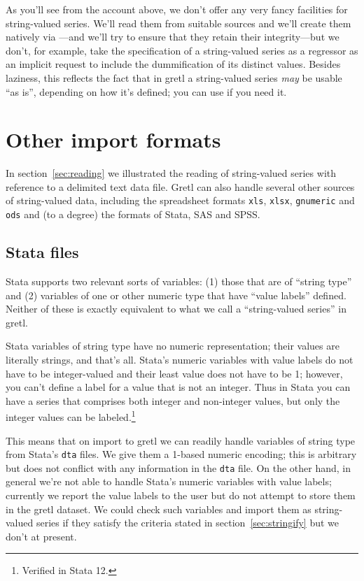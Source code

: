 As you'll see from the account above, we don't offer any very fancy
facilities for string-valued series. We'll read them from suitable
sources and we'll create them natively via ---and
we'll try to ensure that they retain their integrity---but we don't,
for example, take the specification of a string-valued series as a
regressor as an implicit request to include the dummification of its
distinct values. Besides laziness, this reflects the fact that in
gretl a string-valued series \textit{may} be usable ``as is'',
depending on how it's defined; you can use  if you
need it.

\section{Other import formats}
\label{sec:other-imports}

In section~\ref{sec:reading} we illustrated the reading of
string-valued series with reference to a delimited text data
file. Gretl can also handle several other sources of string-valued
data, including the spreadsheet formats \texttt{xls}, \texttt{xlsx},
\texttt{gnumeric} and \texttt{ods} and (to a degree) the formats of
\textsf{Stata}, \textsf{SAS} and \textsf{SPSS}.

\subsection{Stata files}

Stata supports two relevant sorts of variables: (1) those that are of
``string type'' and (2) variables of one or other numeric type that
have ``value labels'' defined. Neither of these is exactly equivalent
to what we call a ``string-valued series'' in gretl.

Stata variables of string type have no numeric representation; their
values are literally strings, and that's all. Stata's numeric
variables with value labels do not have to be integer-valued and their
least value does not have to be 1; however, you can't define a label
for a value that is not an integer. Thus in Stata you can have a
series that comprises both integer and non-integer values, but only
the integer values can be labeled.\footnote{Verified in Stata 12.}

This means that on import to gretl we can readily handle variables of
string type from Stata's \texttt{dta} files. We give them a 1-based
numeric encoding; this is arbitrary but does not conflict with any
information in the \texttt{dta} file. On the other hand, in general
we're not able to handle Stata's numeric variables with value labels;
currently we report the value labels to the user but do not attempt to
store them in the gretl dataset. We could check such variables and
import them as string-valued series if they satisfy the criteria
stated in section~\ref{sec:stringify} but we don't at present.

